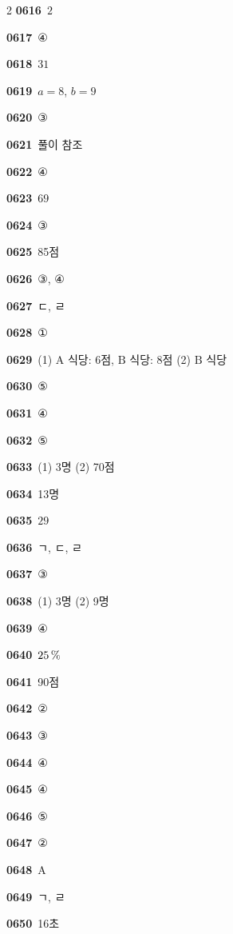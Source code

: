 \documentclass[10pt,a4paper]{article}
\newcommand{\pt}[1]{\mathrm{#1}}
\begin{document}
\begin{multicols}{2}
\noindent\textbf{0616}\ $2$\par
\noindent\textbf{0617}\ ④\par
\noindent\textbf{0618}\ $31$\par
\noindent\textbf{0619}\ $a=8$, $b=9$\par
\noindent\textbf{0620}\ ③\par
\noindent\textbf{0621}\ 풀이 참조\par
\noindent\textbf{0622}\ ④\par
\noindent\textbf{0623}\ $69$\par
\noindent\textbf{0624}\ ③\par
\noindent\textbf{0625}\ 85점\par
\noindent\textbf{0626}\ ③, ④\par
\noindent\textbf{0627}\ ㄷ, ㄹ\par
\noindent\textbf{0628}\ ①\par
\noindent\textbf{0629}\ (1) $\pt{A}$ 식당: 6점, $\pt{B}$ 식당: 8점 (2) $\pt{B}$ 식당\par
\noindent\textbf{0630}\ ⑤\par
\noindent\textbf{0631}\ ④\par
\noindent\textbf{0632}\ ⑤\par
\noindent\textbf{0633}\ (1) 3명 (2) 70점\par
\noindent\textbf{0634}\ 13명\par
\noindent\textbf{0635}\ $29$\par
\noindent\textbf{0636}\ ㄱ, ㄷ, ㄹ\par
\noindent\textbf{0637}\ ③\par
\noindent\textbf{0638}\ (1) 3명 (2) 9명\par
\noindent\textbf{0639}\ ④\par
\noindent\textbf{0640}\ $25\mkern3mu \%$\par
\noindent\textbf{0641}\ 90점\par
\noindent\textbf{0642}\ ②\par
\noindent\textbf{0643}\ ③\par
\noindent\textbf{0644}\ ④\par
\noindent\textbf{0645}\ ④\par
\noindent\textbf{0646}\ ⑤\par
\noindent\textbf{0647}\ ②\par
\noindent\textbf{0648}\ $\pt{A}$\par
\noindent\textbf{0649}\ ㄱ, ㄹ\par
\noindent\textbf{0650}\ 16초\par

\end{multicols}
\end{document}
